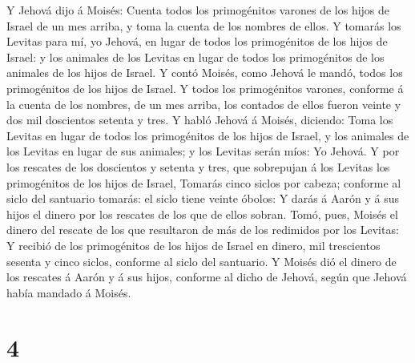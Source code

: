  Y Jehová dijo á Moisés: Cuenta todos los primogénitos
varones de los hijos de Israel de un mes arriba, y toma la cuenta de los
nombres de ellos.  Y tomarás los Levitas para mí, yo
Jehová, en lugar de todos los primogénitos de los hijos de Israel: y los
animales de los Levitas en lugar de todos los primogénitos de los
animales de los hijos de Israel.  Y contó Moisés, como
Jehová le mandó, todos los primogénitos de los hijos de Israel.
 Y todos los primogénitos varones, conforme á la cuenta
de los nombres, de un mes arriba, los contados de ellos fueron veinte y
dos mil doscientos setenta y tres.  Y habló Jehová á
Moisés, diciendo:  Toma los Levitas en lugar de todos los
primogénitos de los hijos de Israel, y los animales de los Levitas en
lugar de sus animales; y los Levitas serán míos: Yo Jehová.
 Y por los rescates de los doscientos y setenta y tres,
que sobrepujan á los Levitas los primogénitos de los hijos de Israel,
 Tomarás cinco siclos por cabeza; conforme al siclo del
santuario tomarás: el siclo tiene veinte óbolos:  Y darás
á Aarón y á sus hijos el dinero por los rescates de los que de ellos
sobran.  Tomó, pues, Moisés el dinero del rescate de los
que resultaron de más de los redimidos por los Levitas: 
Y recibió de los primogénitos de los hijos de Israel en dinero, mil
trescientos sesenta y cinco siclos, conforme al siclo del santuario.
 Y Moisés dió el dinero de los rescates á Aarón y á sus
hijos, conforme al dicho de Jehová, según que Jehová había mandado á
Moisés.

\hypertarget{section-3}{%
\section{4}\label{section-3}}

